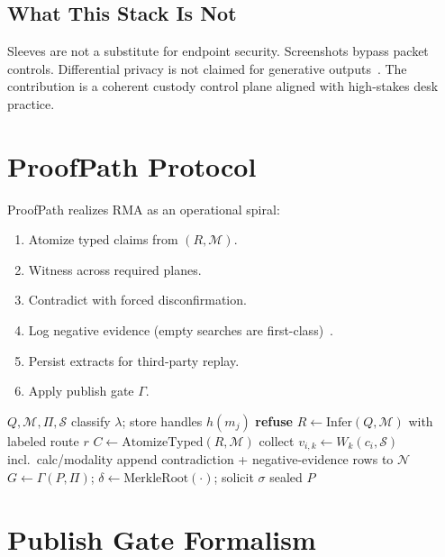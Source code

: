 \documentclass[journal,10pt,twocolumn,a4paper]{IEEEtran}
\begin{document}
\subsection{What This Stack Is Not}
Sleeves are not a substitute for endpoint security.
Screenshots bypass packet controls.
Differential privacy is not claimed for generative outputs~\cite{dwork2006differential}.
The contribution is a coherent custody control plane aligned with high-stakes desk practice.

\section{ProofPath Protocol}
\label{sec:proofpath}

ProofPath realizes RMA as an operational spiral:
\begin{enumerate}
  \item Atomize typed claims from $(R,\mathcal{M})$.
  \item Witness across required planes.
  \item Contradict with forced disconfirmation.
  \item Log negative evidence (empty searches are first-class)~\cite{silverman2015verification}.
  \item Persist extracts for third-party replay.
  \item Apply publish gate $\Gamma$.
\end{enumerate}

\begin{algorithm}[!t]
\caption{Multimodal ProofPath (simplified)}
\begin{algorithmic}[1]
\Require $Q,\mathcal{M},\Pi,\mathcal{S}$
\State classify $\lambda$; store handles $h(m_j)$
\State \textbf{refuse} 
\EndIf
\State $R\gets\mathrm{Infer}(Q,\mathcal{M})$ with labeled route $r$
\State $C\gets\mathrm{AtomizeTyped}(R,\mathcal{M})$
  \State collect $v_{i,k}\gets W_k(c_i,\mathcal{S})$ incl.\ calc/modality
  \State append contradiction + negative-evidence rows to $\mathcal{N}$
\EndFor
\State $G\gets\Gamma(P,\Pi)$; $\delta\gets\mathrm{MerkleRoot}(\cdot)$; solicit $\sigma$
\State \Return sealed $P$
\end{algorithmic}
\end{algorithm}

\section{Publish Gate Formalism}
\label{sec:gate}
\end{document}
